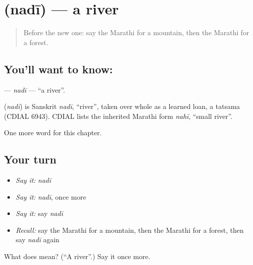 \section[\texorpdfstring{\mr{नदी} (nadī)}{नदी (nadī)}]{ (nadī) — a river}

\label{lesson:MR-C96-nadi}



\begin{quote}
Before the new one: say the Marathi for a mountain, then the Marathi for a forest.
\end{quote}

\subsection*{You'll want to know: }
\textbf{} — \emph{nadī} — \textquotedblleft{}a river\textquotedblright{}.

\begin{cousinweb}
\textbf{} (\emph{nadī}) is Sanskrit \emph{nadī}, \textquotedblleft{}river\textquotedblright{}, taken over whole as a learned loan, a tatsama (CDIAL 6943). CDIAL lists the inherited Marathi form \emph{nahī}, \textquotedblleft{}small river\textquotedblright{}.
\end{cousinweb}

\begin{grammarlens}[title={What you've built}]
One more word for this chapter.
\end{grammarlens}

\subsection*{Your turn}
\begin{itemize}
\raggedright
  \item \emph{Say it:} \emph{nadī}
  \item \emph{Say it:} \emph{nadī}, once more
  \item \emph{Say it:} say \emph{nadī}
  \item \emph{Recall:} say the Marathi for a mountain, then the Marathi for a forest, then say \emph{nadī} again
\end{itemize}

\begin{tcolorbox}[breakable,colback=teal!4,colframe=teal!35!black,title={Before you move on}]
What does  mean? (\textquotedblleft{}A river\textquotedblright{}.) Say it once more.
\end{tcolorbox}
